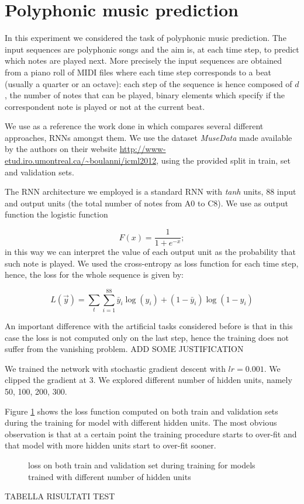  
\section{Polyphonic music prediction}

In this experiment we considered the task of polyphonic music prediction. The input sequences are polyphonic songs and the aim is, at each time step, to predict which notes are played next. More precisely the input sequences are obtained from a piano roll of MIDI files where each time step corresponds to a beat (usually a quarter or an octave): each step of the sequence is hence composed of $d$, the number of notes that can be played,  binary elements which specify if the correspondent note is played or not at the current beat.

We use as a reference the work done in \cite{BoulangerMuse} which compares several different approaches, RNNs amongst them. We use the dataset \textsl{MuseData} made available by the authors on their website
\url{http://www-etud.iro.umontreal.ca/~boulanni/icml2012}, using the provided split in train, set and validation sets.

The RNN architecture we employed is a standard RNN with \textit{tanh} units, 88 input and output units (the total number of notes from A0 to C8). We use as output function the logistic function

\begin{equation}
	F(x)=\frac{1}{1+e^{-x}};
\end{equation}
in this way we can interpret the value of each output unit as the probability that such note is played. We used the cross-entropy as loss function for each time step, hence, the loss for the whole sequence is given by:

\begin{equation}
	L(\vec{y}) = \sum_t\sum_{i=1}^{88} \bar{y}_i \log(y_i) + (1-\bar{y}_i)\log(1-y_i)
\end{equation}

An important difference with the artificial tasks considered before is that in this case the loss is not computed only on the last step, hence the training does not suffer from the vanishing problem. ADD SOME JUSTIFICATION

We trained the network with stochastic gradient descent with $lr=0.001$. We clipped the gradient at $3$. We explored different number of hidden units, namely 50, 100, 200, 300.

Figure \ref{overfitting_muse} shows the loss function computed on both train and validation sets during the training for model with different hidden units. The most obvious observation is that at a certain point the training procedure starts to over-fit and that model with more hidden units start to over-fit sooner.

\begin{figure}
	\centering
\resizebox{15cm}{!}{
	
}
\caption{loss on both train and validation set during training for models trained with different number of hidden units}
\label{overfitting_muse}
\end{figure}

TABELLA RISULTATI TEST

